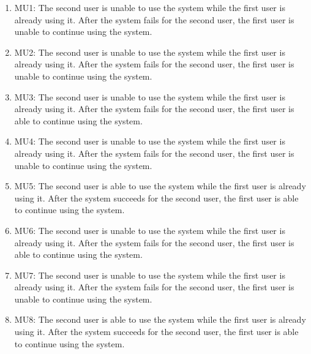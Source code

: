 \documentclass{article}
\begin{document}
\begin{enumerate}
    \item MU1: The second user is unable to use the system while the first user is already using it. After the system fails for the second user, the first user is unable to continue using the system.
    \item MU2: The second user is unable to use the system while the first user is already using it. After the system fails for the second user, the first user is unable to continue using the system.
    \item MU3: The second user is unable to use the system while the first user is already using it. After the system fails for the second user, the first user is able to continue using the system.
    \item MU4: The second user is unable to use the system while the first user is already using it. After the system fails for the second user, the first user is unable to continue using the system.
    \item MU5: The second user is able to use the system while the first user is already using it. After the system succeeds for the second user, the first user is able to continue using the system.
    \item MU6: The second user is unable to use the system while the first user is already using it. After the system fails for the second user, the first user is able to continue using the system.
    \item MU7: The second user is unable to use the system while the first user is already using it. After the system fails for the second user, the first user is unable to continue using the system.
    \item MU8: The second user is able to use the system while the first user is already using it. After the system succeeds for the second user, the first user is able to continue using the system.
\end{enumerate}
\end{document}
